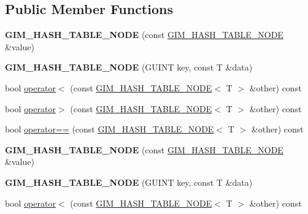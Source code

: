 \subsection*{Public Member Functions}
\begin{DoxyCompactItemize}
\item 
\mbox{\label{structGIM__HASH__TABLE__NODE_abcc41d98b6e27056b35eb6eed0031ebd}} 
{\bfseries G\+I\+M\+\_\+\+H\+A\+S\+H\+\_\+\+T\+A\+B\+L\+E\+\_\+\+N\+O\+DE} (const \hyperlink{structGIM__HASH__TABLE__NODE}{G\+I\+M\+\_\+\+H\+A\+S\+H\+\_\+\+T\+A\+B\+L\+E\+\_\+\+N\+O\+DE} \&value)
\item 
\mbox{\label{structGIM__HASH__TABLE__NODE_a1aa08db268159b479a70df1f520f0519}} 
{\bfseries G\+I\+M\+\_\+\+H\+A\+S\+H\+\_\+\+T\+A\+B\+L\+E\+\_\+\+N\+O\+DE} (G\+U\+I\+NT key, const T \&data)
\item 
bool \hyperlink{structGIM__HASH__TABLE__NODE_a79caf0e810ef6bf7acb17453fa60e2fc}{operator$<$} (const \hyperlink{structGIM__HASH__TABLE__NODE}{G\+I\+M\+\_\+\+H\+A\+S\+H\+\_\+\+T\+A\+B\+L\+E\+\_\+\+N\+O\+DE}$<$ T $>$ \&other) const
\item 
bool \hyperlink{structGIM__HASH__TABLE__NODE_acf7640e2bb9d45004154a4647eb4ef46}{operator$>$} (const \hyperlink{structGIM__HASH__TABLE__NODE}{G\+I\+M\+\_\+\+H\+A\+S\+H\+\_\+\+T\+A\+B\+L\+E\+\_\+\+N\+O\+DE}$<$ T $>$ \&other) const
\item 
bool \hyperlink{structGIM__HASH__TABLE__NODE_a94b797f611495d4e7661e7d188f61e38}{operator==} (const \hyperlink{structGIM__HASH__TABLE__NODE}{G\+I\+M\+\_\+\+H\+A\+S\+H\+\_\+\+T\+A\+B\+L\+E\+\_\+\+N\+O\+DE}$<$ T $>$ \&other) const
\item 
\mbox{\label{structGIM__HASH__TABLE__NODE_abcc41d98b6e27056b35eb6eed0031ebd}} 
{\bfseries G\+I\+M\+\_\+\+H\+A\+S\+H\+\_\+\+T\+A\+B\+L\+E\+\_\+\+N\+O\+DE} (const \hyperlink{structGIM__HASH__TABLE__NODE}{G\+I\+M\+\_\+\+H\+A\+S\+H\+\_\+\+T\+A\+B\+L\+E\+\_\+\+N\+O\+DE} \&value)
\item 
\mbox{\label{structGIM__HASH__TABLE__NODE_a1aa08db268159b479a70df1f520f0519}} 
{\bfseries G\+I\+M\+\_\+\+H\+A\+S\+H\+\_\+\+T\+A\+B\+L\+E\+\_\+\+N\+O\+DE} (G\+U\+I\+NT key, const T \&data)
\item 
bool \hyperlink{structGIM__HASH__TABLE__NODE_a79caf0e810ef6bf7acb17453fa60e2fc}{operator$<$} (const \hyperlink{structGIM__HASH__TABLE__NODE}{G\+I\+M\+\_\+\+H\+A\+S\+H\+\_\+\+T\+A\+B\+L\+E\+\_\+\+N\+O\+DE}$<$ T $>$ \&other) const

\end{DoxyCompactItemize}
